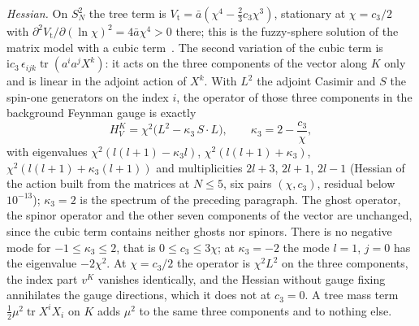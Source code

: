\emph{Hessian.} On \(S^2_N\) the tree term is \(V_{\mathrm t}=\bar a(\chi^4-\tfrac23c_3\chi^3)\), stationary at \(\chi=c_3/2\) with \(\partial^2V_{\mathrm t}/\partial(\ln\chi)^2=4\bar a\chi^4>0\) there; this is the fuzzy-sphere solution of the matrix model with a cubic term~\cite{IsoKimuraTanakaWakatsuki2001}. The second variation of the cubic term is \(\mathrm ic_3\,\epsilon_{ijk}\operatorname{tr}(a^ia^jX^k)\): it acts on the three components of the vector along \(K\) only and is linear in the adjoint action of \(X^k\). With \(L^2\) the adjoint Casimir and \(S\) the spin-one generators on the index \(i\), the operator of those three components in the background Feynman gauge is exactly
\[
  H_V^K=\chi^2\bigl(L^2-\kappa_3\,S\cdot L\bigr),\qquad \kappa_3=2-\frac{c_3}\chi ,
\]
with eigenvalues \(\chi^2(l(l+1)-\kappa_3l)\), \(\chi^2(l(l+1)+\kappa_3)\), \(\chi^2(l(l+1)+\kappa_3(l+1))\) and multiplicities \(2l+3\), \(2l+1\), \(2l-1\) (Hessian of the action built from the matrices at \(N\le5\), six pairs \((\chi,c_3)\), residual below \(10^{-13}\)); \(\kappa_3=2\) is the spectrum of the preceding paragraph. The ghost operator, the spinor operator and the other seven components of the vector are unchanged, since the cubic term contains neither ghosts nor spinors. There is no negative mode for \(-1\le\kappa_3\le2\), that is \(0\le c_3\le3\chi\); at \(\kappa_3=-2\) the mode \(l=1\), \(j=0\) has the eigenvalue \(-2\chi^2\). At \(\chi=c_3/2\) the operator is \(\chi^2L^2\) on the three components, the index part \(v^K\) vanishes identically, and the Hessian without gauge fixing annihilates the gauge directions, which it does not at \(c_3=0\). A tree mass term \(\tfrac12\mu^2\operatorname{tr}X^iX_i\) on \(K\) adds \(\mu^2\) to the same three components and to nothing else.

